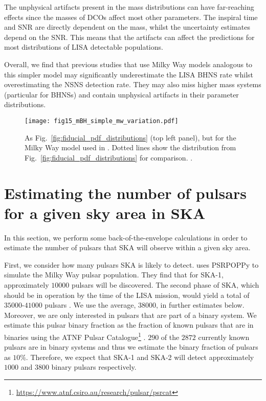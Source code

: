 The unphysical artifacts present in the mass distributions can have far-reaching effects since the masses of DCOs affect most other parameters. The inspiral time and SNR are directly dependent on the mass, whilst the uncertainty estimates depend on the SNR. This means that the artifacts can affect the predictions for most distributions of LISA detectable populations.

Overall, we find that previous studies that use Milky Way models analogous to this simpler model may significantly underestimate the LISA BHNS rate whilst overestimating the NSNS detection rate. They may also miss higher mass systems (particular for BHNSs) and contain unphysical artifacts in their parameter distributions.

\begin{figure}[htb]
    \centering
    \texttt{[image: fig15\_mBH\_simple\_mw\_variation.pdf]}
    \caption{As Fig.~\ref{fig:fiducial_pdf_distributions} (top left panel), but for the Milky Way model used in \citet{Breivik+2020}. Dotted lines show the distribution from Fig.~\ref{fig:fiducial_pdf_distributions} for comparison. \href{https://github.com/TomWagg/detecting-DCOs-in-LISA/blob/main/paper/figures/fig15_mBH_simple_mw_variation.pdf}{\faFileImage} \href{https://github.com/TomWagg/detecting-DCOs-in-LISA/blob/main/paper/figure_notebooks/fiducial.ipynb}{\faBook}.}
    \label{fig:bh_mass_simple_mw}
\end{figure}

\section{Estimating the number of pulsars for a given sky area in SKA}\label{app:ska_area}

In this section, we perform some back-of-the-envelope calculations in order to estimate the number of pulsars that SKA will observe within a given sky area.

First, we consider how many pulsars SKA is likely to detect. \citet{Keane+2015} uses PSRPOPPy \citep{Bates+2014} to simulate the Milky Way pulsar population. They find that for SKA-1, approximately $10000$ pulsars will be discovered. The second phase of SKA, which should be in operation by the time of the LISA mission, would yield a total of $35000$-$41000$ pulsars \citep{Keane+2015}. We use the average, $38000$, in further estimates below. Moreover, we are only interested in pulsars that are part of a binary system. We estimate this pulsar binary fraction as the fraction of known pulsars that are in binaries using the ATNF Pulsar Catalogue\footnote{\url{https://www.atnf.csiro.au/research/pulsar/psrcat}} \citep{Manchester+2005}. $290$ of the $2872$ currently known pulsars are in binary systems and thus we estimate the binary fraction of pulsars as $10\%$. Therefore, we expect that SKA-1 and SKA-2 will detect approximately $1000$ and $3800$ binary pulsars respectively.

